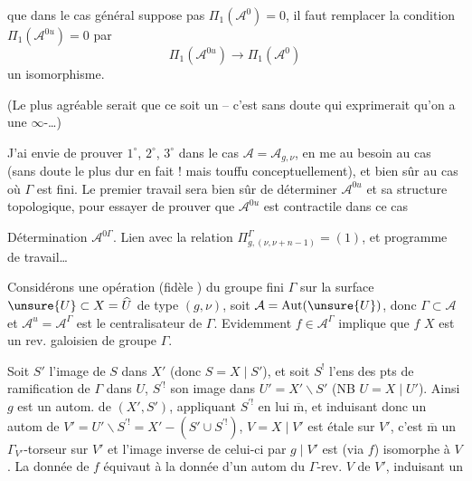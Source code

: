 
 que dans le cas général  suppose pas $\Pi_1(\mathcal A^0)=0$, il faut remplacer la condition $\Pi_1(\mathcal A^{0u})=0$ par
\[
\Pi_1(\mathcal A^{0u})\longrightarrow\Pi_1(\mathcal A^0)
\]
un isomorphisme.


(Le plus agréable serait que ce soit un  -- c'est  sans doute qui exprimerait qu'on a une $\infty$-\ldots)

J'ai envie de prouver  $1^\circ$, $2^\circ$, $3^\circ$ dans le cas $\mathcal A=\mathcal A_{g,\nu}$, en me  au besoin au cas  (sans doute le plus dur en fait ! \unsure{\}} mais   touffu conceptuellement), et bien sûr au cas où $\Gamma$ est fini. Le premier travail sera bien sûr  de déterminer $\mathcal A^{0u}$ et sa structure topologique, pour essayer de prouver que $\mathcal A^{0u}$ est contractile dans ce cas


  Détermination  $\mathcal A^{0\Gamma}$. Lien avec la relation $\Pi_{g,(\nu,\nu+n-1)}^\Gamma=(1)$, et programme de travail\ldots

Considérons une opération (fidèle ) du groupe fini $\Gamma$ sur la surface $\unsure{U}\subset X=\widehat U$ de type $(g,\nu)$,  soit $\mathcal A=\operatorname{Aut}(\unsure{U})$, donc $\Gamma\subset\mathcal A$ et $\mathcal A^{u}=\mathcal A^\Gamma$ est le centralisateur de $\Gamma$.  Evidemment $f\in\mathcal A^\Gamma$ implique que $f$    $X$ est un rev. galoisien de groupe $\Gamma$.

Soit $S'$ l'image de $S$ dans $X'$ (donc $S=X\mid S'$), et soit $S^!$ l'ens des pts de ramification de $\Gamma$ dans $U$, $S^{\prime!}$ son image dans $U'=X'\backslash S'$ (NB $U=X\mid U'$). Ainsi $g$ est un autom. de $(X',S')$, appliquant $S^{\prime!}$ en lui $\overline{\mathrm m}$, et  induisant donc un autom de $V'=U'\backslash S^{\prime!}=X'-(S'\cup S^{\prime!})$,     $V=X\mid V'$ est étale sur $V'$, c'est $\overline{\mathrm m}$ un $\Gamma_{V'}$-torseur sur $V'$ et l'image inverse de celui-ci par $g\mid V'$ est (via $f$) isomorphe à $V$. La donnée de $f$ équivaut à la donnée d'un autom du  $\Gamma$-rev. $V$ de $V'$, induisant un

